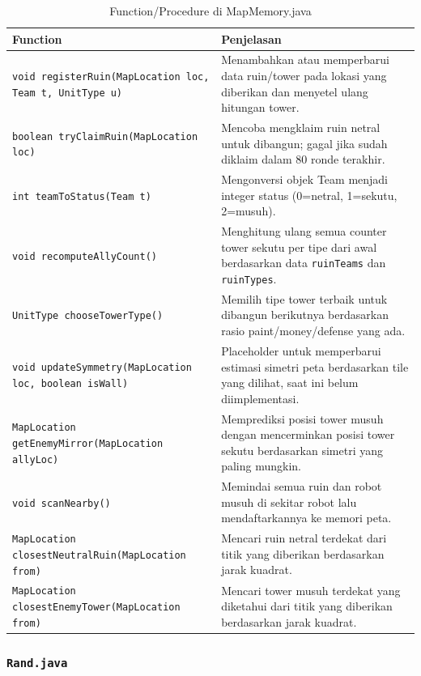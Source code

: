 \documentclass{article}
\begin{document}
\begin{enumerate}[label=\alph*.]
\begin{longtable}{|p{}|p{}|}
    \caption{Function/Procedure di MapMemory.java} \\
\hline
\textbf{Function} & \textbf{Penjelasan} \\
\hline
\endhead
\hline
\endfoot
\texttt{void registerRuin(MapLocation loc, Team t, UnitType u)} & Menambahkan atau memperbarui data ruin/tower pada lokasi yang diberikan dan menyetel ulang hitungan tower. \\
\hline
\texttt{boolean tryClaimRuin(MapLocation loc)} & Mencoba mengklaim ruin netral untuk dibangun; gagal jika sudah diklaim dalam 80 ronde terakhir. \\
\hline
\texttt{int teamToStatus(Team t)} & Mengonversi objek Team menjadi integer status (0=netral, 1=sekutu, 2=musuh). \\
\hline
\texttt{void recomputeAllyCount()} & Menghitung ulang semua counter tower sekutu per tipe dari awal berdasarkan data \texttt{ruinTeams} dan \texttt{ruinTypes}. \\
\hline
\texttt{UnitType chooseTowerType()} & Memilih tipe tower terbaik untuk dibangun berikutnya berdasarkan rasio paint/money/defense yang ada. \\
\hline
\texttt{void updateSymmetry(MapLocation loc, boolean isWall)} & Placeholder untuk memperbarui estimasi simetri peta berdasarkan tile yang dilihat, saat ini belum diimplementasi. \\
\hline
\texttt{MapLocation getEnemyMirror(MapLocation allyLoc)} & Memprediksi posisi tower musuh dengan mencerminkan posisi tower sekutu berdasarkan simetri yang paling mungkin. \\
\hline
\texttt{void scanNearby()} & Memindai semua ruin dan robot musuh di sekitar robot lalu mendaftarkannya ke memori peta. \\
\hline
\texttt{MapLocation closestNeutralRuin(MapLocation from)} & Mencari ruin netral terdekat dari titik yang diberikan berdasarkan jarak kuadrat. \\
\hline
\texttt{MapLocation closestEnemyTower(MapLocation from)} & Mencari tower musuh terdekat yang diketahui dari titik yang diberikan berdasarkan jarak kuadrat. \\
\hline
\end{longtable}

\subsubsection{\lstinline|Rand.java|}


\end{enumerate}
\end{document}
